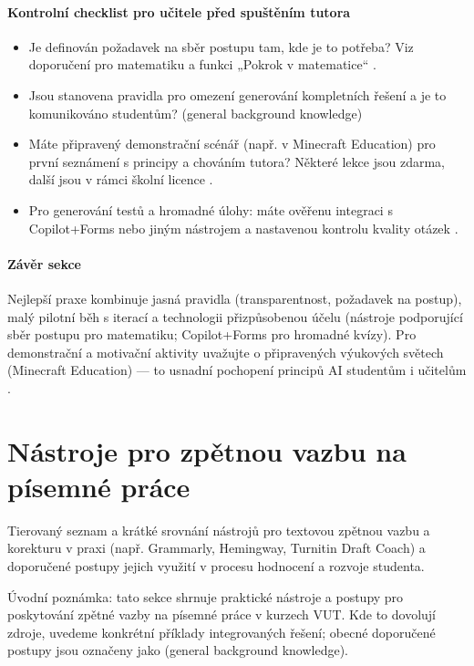 \documentclass{report}%
\begin{document}
\paragraph{Kontrolní checklist pro učitele před spuštěním tutora}
\begin{itemize}
  \item Je definován požadavek na sběr postupu tam, kde je to potřeba? Viz doporučení pro matematiku a funkci „Pokrok v matematice“ \cite{kb_ai_101_tipu_pdf_04e4a115_page_8_1}.
  \item Jsou stanovena pravidla pro omezení generování kompletních řešení a je to komunikováno studentům? (general background knowledge)
  \item Máte připravený demonstrační scénář (např. v Minecraft Education) pro první seznámení s principy a chováním tutora? Některé lekce jsou zdarma, další jsou v rámci školní licence \cite{kb_ai_101_tipu_pdf_04e4a115_page_15_2}.
  \item Pro generování testů a hromadné úlohy: máte ověřenu integraci s Copilot+Forms nebo jiným nástrojem a nastavenou kontrolu kvality otázek \cite{kb_ai_101_tipu_pdf_04e4a115_page_36_1}.
\end{itemize}

\paragraph{Závěr sekce}
Nejlepší praxe kombinuje jasná pravidla (transparentnost, požadavek na postup), malý pilotní běh s iterací a technologii přizpůsobenou účelu (nástroje podporující sběr postupu pro matematiku; Copilot+Forms pro hromadné kvízy). Pro demonstrační a motivační aktivity uvažujte o připravených výukových světech (Minecraft Education) — to usnadní pochopení principů AI studentům i učitelům \cite{kb_ai_101_tipu_pdf_04e4a115_page_15_2, kb_ai_101_tipu_pdf_04e4a115_page_36_1, kb_ai_101_tipu_pdf_04e4a115_page_8_1}.%

%
\section{Nástroje pro zpětnou vazbu na písemné práce}%
Tierovaný seznam a krátké srovnání nástrojů pro textovou zpětnou vazbu a korekturu v praxi (např. Grammarly, Hemingway, Turnitin Draft Coach) a doporučené postupy jejich využití v procesu hodnocení a rozvoje studenta.%


%
Úvodní poznámka: tato sekce shrnuje praktické nástroje a postupy pro poskytování zpětné vazby na písemné práce v kurzech VUT. Kde to dovolují zdroje, uvedeme konkrétní příklady integrovaných řešení; obecné doporučené postupy jsou označeny jako (general background knowledge).
\end{document}
